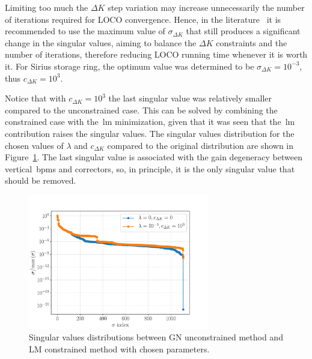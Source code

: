 Limiting too much the $\Delta K$ step variation may increase unnecessarily the number of iterations required for LOCO convergence. Hence, in the literature~\cite{icfa_huang, huang2013} it is recommended to use the maximum value of $\sigma_{\Delta K}$ that still produces a significant change in the singular values, aiming to balance the $\Delta K$ constraints and the number of iterations, therefore reducing LOCO running time whenever it is worth it. For Sirius storage ring, the optimum value was determined to be $\sigma_{\Delta K} = 10^{-3}$, thus $c_{\Delta K} = 10^{3}$.

Notice that with $c_{\Delta K}=10^{3}$ the last singular value was relatively smaller compared to the unconstrained case. This can be solved by combining the constrained case with the~\gls{lm} minimization, given that it was seen that the~\gls{lm} contribution raises the singular values. The singular values distribution for the chosen values of $\lambda$ and $c_{\Delta K}$ compared to the original distribution are shown in Figure~\ref{fig:compare_svs}. The last singular value is associated with the gain degeneracy between vertical~\glspl{bpm} and correctors, so, in principle, it is the only singular value that should be removed.
\begin{figure}
\centering
\includegraphics[width=0.70\textwidth]{figures/chosen_singular_values.pdf}
\caption{Singular values distributions between GN unconstrained method and LM constrained method with chosen parameters.}
\label{fig:compare_svs}
\end{figure}